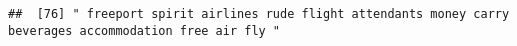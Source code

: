\documentclass[
]{article}
\begin{document}
\begin{verbatim}
##  [76] " freeport spirit airlines rude flight attendants money carry beverages accommodation free air fly "                                                                                                                                                                                                                                                                                                                                                                                                                                                                                                                                                                                                                                                                                                                                                                                                                                                                                                                                                                                                                                                                                                                                                                                                                                                                                                                                                                                                                                                                                                                                                                                                                                                                                            

\end{verbatim}
\end{document}
